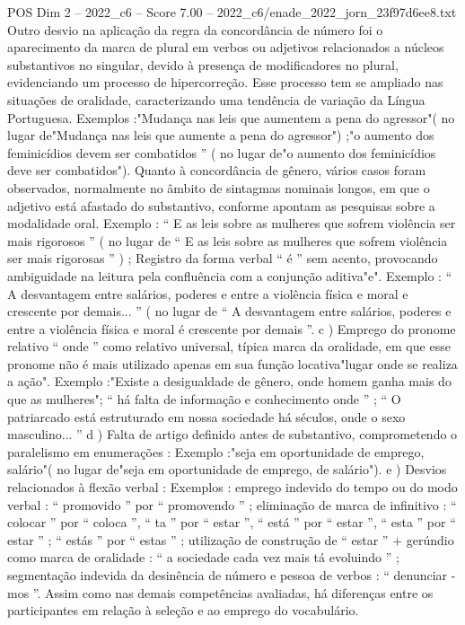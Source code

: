 \begin{textsample}{POS Dim 2 – 2022\_c6 – Score 7.00 – 2022\_c6/enade\_2022\_jorn\_23f97d6ee8.txt}
Outro desvio na aplicação da regra da concordância de número foi o aparecimento da marca de plural em verbos ou adjetivos relacionados a núcleos substantivos no singular, devido à presença de modificadores no plural, evidenciando um processo de hipercorreção.
Esse processo tem se ampliado nas situações de oralidade, caracterizando uma tendência de variação da Língua Portuguesa.
Exemplos :"Mudança nas leis que aumentem a pena do agressor"( no lugar de"Mudança nas leis que aumente a pena do agressor") ;"o aumento dos feminicídios devem ser combatidos ” ( no lugar de"o aumento dos feminicídios deve ser combatidos").
Quanto à concordância de gênero, vários casos foram observados, normalmente no âmbito de sintagmas nominais longos, em que o adjetivo está afastado do substantivo, conforme apontam as pesquisas sobre a modalidade oral.
Exemplo : “ E as leis sobre as mulheres que sofrem violência ser mais rigorosos ” ( no lugar de “ E as leis sobre as mulheres que sofrem violência ser mais rigorosas ” ) ; Registro da forma verbal “ é ” sem acento, provocando ambiguidade na leitura pela confluência com a conjunção aditiva"e".
Exemplo : “ A desvantagem entre salários, poderes e entre a violência física e moral e crescente por demais... ” ( no lugar de “ A desvantagem entre salários, poderes e entre a violência física e moral é crescente por demais ”. c ) Emprego do pronome relativo “ onde ” como relativo universal, típica marca da oralidade, em que esse pronome não é mais utilizado apenas em sua função locativa"lugar onde se realiza a ação".
Exemplo :"Existe a desigualdade de gênero, onde homem ganha mais do que as mulheres"; “ há falta de informação e conhecimento onde ” ; “ O patriarcado está estruturado em nossa sociedade há séculos, onde o sexo masculino... ” d ) Falta de artigo definido antes de substantivo, comprometendo o paralelismo em enumerações : Exemplo :"seja em oportunidade de emprego, salário"( no lugar de"seja em oportunidade de emprego, de salário"). e ) Desvios relacionados à flexão verbal : Exemplos : emprego indevido do tempo ou do modo verbal : “ promovido ” por “ promovendo ” ; eliminação de marca de infinitivo : “ colocar ” por “ coloca ”, “ ta ” por “ estar ”, “ está ” por “ estar ”, “ esta ” por “ estar ” ; “ estás ” por “ estas ” ; utilização de construção de “ estar ” + gerúndio como marca de oralidade : “ a sociedade cada vez mais tá evoluindo ” ; segmentação indevida da desinência de número e pessoa de verbos : “ denunciar -mos ”.
Assim como nas demais competências avaliadas, há diferenças entre os participantes em relação à seleção e ao emprego do vocabulário.

\end{textsample}
